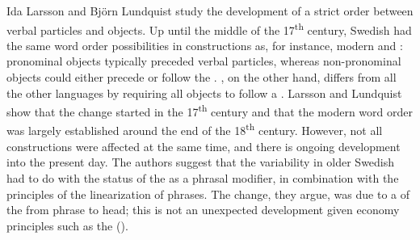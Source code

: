 \documentclass[output=paper]{langscibook}
\begin{document}
Ida Larsson and Björn Lundquist study the development of a strict order between verbal particles and objects. Up until the middle of the 17\textsuperscript{th} century, Swedish had the same word order possibilities in  constructions as, for instance, modern  and : pronominal objects typically preceded verbal particles, whereas non-pronominal objects could either precede or follow the . , on the other hand, differs from all the other  languages by requiring all objects to follow a . Larsson and Lundquist show that the change started in the 17\textsuperscript{th} century and that the modern word order was largely established around the end of the 18\textsuperscript{th} century. However, not all  constructions were affected at the same time, and there is ongoing development into the present day. The authors suggest that the variability in older Swedish had to do with the status of the  as a phrasal modifier, in combination with the principles of the linearization of phrases. The change, they argue, was due to a  of the  from phrase to head; this is not an unexpected development given economy principles such as the  (\citealt{van_Gelderen2004}).
\end{document}
